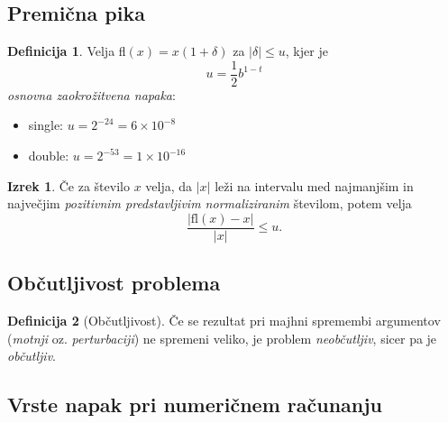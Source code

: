 \documentclass[11pt]{article}
\theoremstyle{definition}
\newtheorem{definicija}{Definicija}[section]
\newtheorem{izrek}{Izrek}
\begin{document}
\subsection{Premična pika}
\vspace{0.5cm}

\begin{definicija}

Velja fl$(x) = x(1 + \delta)$ za $|\delta| \leq u$, kjer je
$$u = \frac{1}{2}b^{1-t}$$
\textit{osnovna zaokrožitvena napaka}:

\begin{itemize}
	\item single: $u = 2^{-24} = 6 \times 10^{-8}$
	\item double: $u = 2^{-53} = 1 \times 10^{-16}$
\end{itemize}

\end{definicija}
\vspace{0.5cm}

\begin{izrek}

Če za število $x$ velja, da $|x|$ leži na intervalu med najmanjšim in največjim \textit{pozitivnim predstavljivim normaliziranim} številom, potem velja
$$\frac{|\text{fl}(x) - x|}{|x|} \leq u.$$

\end{izrek}
\vspace{0.5cm}


\subsection{Občutljivost problema}
\vspace{0.5cm}

\begin{definicija}[Občutljivost]

Če se rezultat pri majhni spremembi argumentov (\textit{motnji} oz. \textit{perturbaciji}) ne spremeni veliko, je problem \textit{neobčutljiv}, sicer pa je \textit{občutljiv}.

\end{definicija}
\vspace{0.5cm}


\subsection{Vrste napak pri numeričnem računanju}
\vspace{0.5cm}
\end{document}

